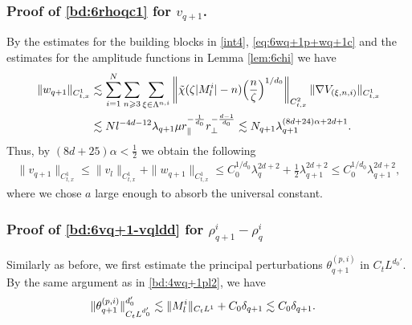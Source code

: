 \documentclass[UTF-8,reqno]{amsart}
\numberwithin{equation}{section}
\theoremstyle{definition}
\def\({{\Big(}}
\def\){{\Big)}}
\newcommand{\norm}[1]{\left\|#1\right\|}
\def\geq{\geqslant}
\def\leq{\leqslant}
\def\({{\Big(}}
\def\){{\Big)}}
\def\geq{\geqslant}
\def\leq{\leqslant}
\begin{document}
\subsubsection{Proof of  \eqref{bd:6rhoqc1} for $v_{q+1}$.}
 By the estimates for the building blocks in \eqref{int4},  \eqref{eq:6wq+1p+wq+1c} and the estimates for the amplitude functions in Lemma \ref{lem:6chi} we have  
\begin{align}
\|w_{q+1}\|_{C_{t,x}^1}&\lesssim\sum_{i=1}^{N}\sum_{n\geq3}\sum_{\xi\in\Lambda^{n,i}}\norm{\tilde{\chi}(\zeta|M^{i}_l|-n)\(\frac{n}{\zeta}\)^{1/d_0}}_{C_{t,x}^{2}}\|\nabla V_{(\xi,n,i)}\|_{C_{t,x}^1} \notag\\
&\lesssim Nl^{-4d-12}\lambda_{q+1}\mu r_\parallel^{-\frac{1}{d_0}}r_\perp^{-\frac{d-1}{d_0}} \lesssim N_{q+1}\lambda_{q+1}^{(8d+24)\alpha+2d+1}.\notag
\end{align}
 Thus, by $ (8d+25)\alpha<\frac{1}{2}$ we obtain the following
 \begin{align*}
\|v_{q+1}\|_{C_{t,x}^1}\leq\|v_{l}\|_{C_{t,x}^1}+\|w_{q+1}\|_{C_{t,x}^1}\leq C_0^{1/d_0}\lambda_{q}^{2d+2}+\frac12\lambda_{q+1}^{2d+2}\leq C_0^{1/d_0}\lambda_{q+1}^{2d+2},
 \end{align*} where we chose $a$ large enough to absorb the universal constant.


\subsubsection{Proof of  \eqref{bd:6vq+1-vqldd} for $\rho^{i}_{q+1}-\rho_q^i$} 
Similarly as before, we first estimate the principal perturbations  $\theta^{(p,i)}_{q+1}$ in $C_tL^{d_0'}$. %
By the same argument as in \eqref{bd:4wq+1pl2}, we have 
\begin{align}
    \|\theta_{q+1}^{(p,i)}\|_{C_tL^{d_0'}}^{d_0'}&\lesssim \|M^{i}_l\|_{C_tL^1}+ C_0\delta_{q+1} 
    \lesssim  C_0\delta_{q+1}. \notag
\end{align} 
\end{document}
